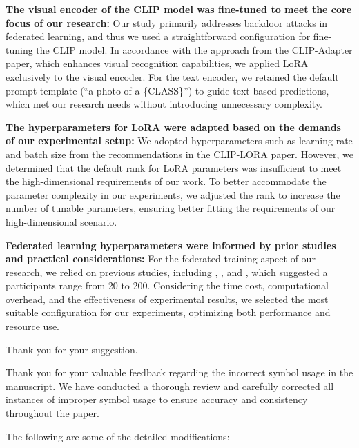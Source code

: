 \documentclass[a4paper,twoside,11pt,dvipsnames]{reviewresponse}
\begin{document}
\textbf{The visual encoder of the CLIP model was fine-tuned to meet the core focus of our research:}
Our study primarily addresses backdoor attacks in federated learning, and thus we used a straightforward configuration for fine-tuning the CLIP model. In accordance with the approach from the CLIP-Adapter\cite{gao2024clip} paper, which enhances visual recognition capabilities, we applied LoRA exclusively to the visual encoder. For the text encoder, we retained the default prompt template (“a photo of a \{CLASS\}”) to guide text-based predictions, which met our research needs without introducing unnecessary complexity.

\textbf{The hyperparameters for LoRA were adapted based on the demands of our experimental setup:}
We adopted hyperparameters such as learning rate and batch size from the recommendations in the CLIP-LORA\cite{zanella2024low} paper. However, we determined that the default rank for LoRA parameters was insufficient to meet the high-dimensional requirements of our work. To better accommodate the parameter complexity in our experiments, we adjusted the rank to increase the number of tunable parameters, ensuring better fitting the requirements of our high-dimensional scenario.

\textbf{Federated learning hyperparameters were informed by prior studies and practical considerations:}
For the federated training aspect of our research, we relied on previous studies, including \cite{wei2023personalized}, \cite{ilhan2023scalefl}, and \cite{wu2023faster}, which suggested a participants range from 20 to 200. Considering the time cost, computational overhead, and  the effectiveness of experimental results, we selected the most suitable configuration for our experiments, optimizing both performance and resource use.


Thank you for your suggestion.

Thank you for your valuable feedback regarding the incorrect symbol usage in the manuscript. We have conducted a thorough review and carefully corrected all instances of improper symbol usage to ensure accuracy and consistency throughout the paper.

The following are some of the detailed modifications: 
\end{document}

